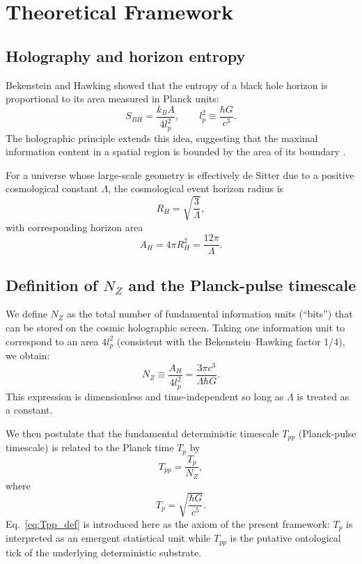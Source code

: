 \documentclass[12pt]{article}
\begin{document}
\section{Theoretical Framework}
\subsection{Holography and horizon entropy}
Bekenstein and Hawking showed that the entropy of a black hole horizon is proportional to its area measured in Planck units:
\begin{equation}\label{eq:SBH}
S_{BH} = \frac{k_B A}{4 l_p^2}, \qquad l_p^2 \equiv \frac{\hbar G}{c^3}.
\end{equation}
The holographic principle extends this idea, suggesting that the maximal information content in a spatial region is bounded by the area of its boundary \cite{tHooft1993,Susskind1995}.

For a universe whose large-scale geometry is effectively de Sitter due to a positive cosmological constant $\Lambda$, the cosmological event horizon radius is
\begin{equation}\label{eq:RH}
R_H = \sqrt{\frac{3}{\Lambda}},
\end{equation}
with corresponding horizon area
\begin{equation}\label{eq:AH}
A_H = 4\pi R_H^2 = \frac{12\pi}{\Lambda}.
\end{equation}

\subsection{Definition of $N_Z$ and the Planck-pulse timescale}
We define $N_Z$ as the total number of fundamental information units (``bits'') that can be stored on the cosmic holographic screen. Taking one information unit to correspond to an area $4 l_p^2$ (consistent with the Bekenstein–Hawking factor 1/4), we obtain:
\begin{equation}\label{eq:NZ}
N_Z \equiv \frac{A_H}{4 l_p^2} = \frac{3\pi c^3}{\Lambda \hbar G}.
\end{equation}
This expression is dimensionless and time-independent so long as $\Lambda$ is treated as a constant.

We then postulate that the fundamental deterministic timescale $T_{pp}$ (Planck-pulse timescale) is related to the Planck time $T_p$ by
\begin{equation}\label{eq:Tpp_def}
T_{pp} = \frac{T_p}{N_Z},
\end{equation}
where
\begin{equation}\label{eq:Tp}
T_p = \sqrt{\frac{\hbar G}{c^5}}.
\end{equation}
Eq.~\eqref{eq:Tpp_def} is introduced here as the axiom of the present framework: $T_p$ is interpreted as an emergent statistical unit while $T_{pp}$ is the putative ontological tick of the underlying deterministic substrate.
\end{document}
